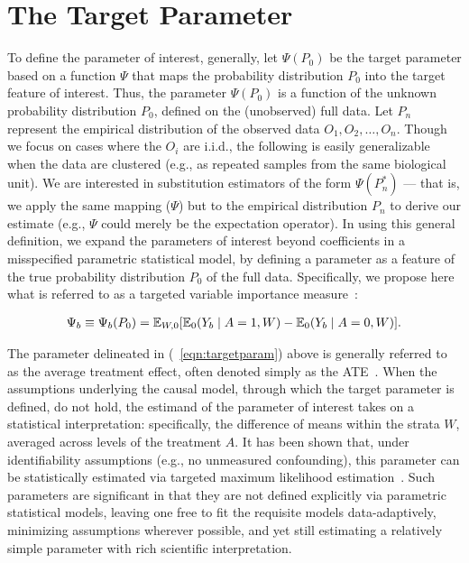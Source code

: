 \section{The Target Parameter}\label{targetparam}

To define the parameter of interest, generally, let $\Psi(P_{0})$ be the
target parameter based on a function $\Psi$ that maps the probability
distribution $P_{0}$ into the target feature of interest. Thus, the parameter
$\Psi(P_{0})$ is a function of the unknown probability distribution $P_{0}$,
defined on the (unobserved) full data. Let $P_{n}$ represent the empirical
distribution of the observed data $O_{1},O_{2}, \dots, O_{n}$. Though we focus
on cases where the $O_i$ are i.i.d., the following is easily generalizable when
the data are clustered (e.g., as repeated samples from the same biological
unit). We are interested in substitution estimators of the form
$\Psi(P_{n}^{*})$ --- that is, we apply the same mapping ($\Psi$) but to the
empirical distribution $P_n$ to derive our estimate (e.g., $\Psi$ could merely
be the expectation operator). In using this general definition, we expand the
parameters of interest beyond coefficients in a misspecified parametric
statistical model, by defining a parameter as a feature of the true probability
distribution $P_{0}$ of the full data. Specifically, we propose here what is
referred to as a targeted variable importance
measure~\cite{bembom2009biomarker}:

\begin{eqnarray}
\label{eqn:targetparam}
\Psi_{b} \equiv \Psi_{b}(P_{0}) = \mathbb{E} _{W,0}[\mathbb{E}_{0}(Y_{b} \mid A = 1, W) -
  \mathbb{E}_{0}(Y_{b} \mid A = 0, W)].
\end{eqnarray}

The parameter delineated in (~\ref{eqn:targetparam}) above is generally referred
to as the average treatment effect, often denoted simply as the
ATE~\cite{rosenbaum1983central}. When the assumptions underlying the causal
model, through which the target parameter is defined, do not hold, the estimand
of the parameter of interest takes on a statistical interpretation:
specifically, the difference of means within the strata $W$, averaged across
levels of the treatment $A$. It has been shown that, under identifiability
assumptions (e.g., no unmeasured confounding), this parameter can be
statistically estimated via targeted maximum likelihood
estimation~\cite{van2011targeted}. Such parameters are significant in that they
are not defined explicitly via parametric statistical models, leaving one free
to fit the requisite models data-adaptively, minimizing assumptions wherever
possible, and yet still estimating a relatively simple parameter with rich
scientific interpretation.

